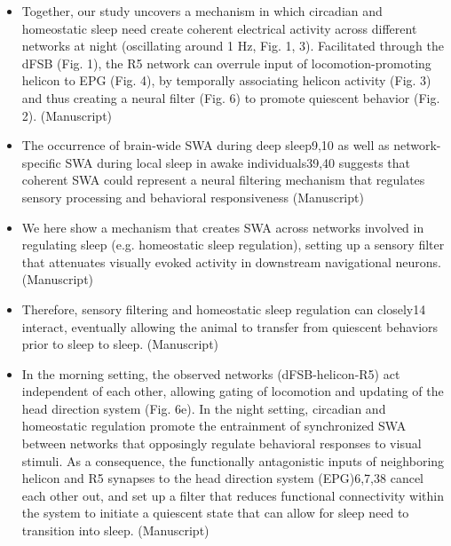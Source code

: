 \documentclass[11pt]{article}
\begin{document}
\begin{itemize}
    \item Together, our study uncovers a mechanism in which circadian and homeostatic sleep need
    create coherent electrical activity across different networks at night (oscillating around 1 Hz,
    Fig. 1, 3). Facilitated through the dFSB (Fig. 1), the R5 network can overrule input of
    locomotion-promoting helicon to EPG (Fig. 4), by temporally associating helicon activity (Fig.
    3) and thus creating a neural filter (Fig. 6) to promote quiescent behavior (Fig. 2).
    \cite{raccugliaCoherentMultilevelNetwork2022} (Manuscript)

    \item The occurrence of brain-wide SWA during deep sleep9,10 as well as network-specific SWA
    during local sleep in awake individuals39,40 suggests that coherent SWA could represent a
    neural filtering mechanism that regulates sensory processing and behavioral
    responsiveness
    \cite{raccugliaCoherentMultilevelNetwork2022} (Manuscript)

    \item We here show
    a mechanism that creates SWA across networks involved in regulating sleep (e.g. homeostatic
    sleep regulation), setting up a sensory filter that attenuates visually evoked activity in
    downstream navigational neurons.
    \cite{raccugliaCoherentMultilevelNetwork2022} (Manuscript)

    \item Therefore, sensory filtering and homeostatic sleep regulation can closely14
    interact, eventually allowing the animal to transfer from quiescent behaviors prior to sleep to
    sleep.
    \cite{raccugliaCoherentMultilevelNetwork2022} (Manuscript)

    \item In the morning setting, the observed networks (dFSB-helicon-R5) act independent of each
    other, allowing gating of locomotion and updating of the head direction system (Fig. 6e). In
    the night setting, circadian and homeostatic regulation promote the entrainment of
    synchronized SWA between networks that opposingly regulate behavioral responses to visual
    stimuli. As a consequence, the functionally antagonistic inputs of neighboring helicon and R5
    synapses to the head direction system (EPG)6,7,38 cancel each other out, and set up a filter that
    reduces functional connectivity within the system to initiate a quiescent state that can allow
    for sleep need to transition into sleep.
    \cite{raccugliaCoherentMultilevelNetwork2022} (Manuscript)


\end{itemize}
\end{document}
